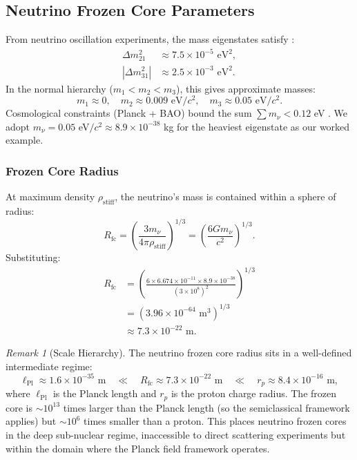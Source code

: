 \documentclass[11pt,a4paper]{article}
\newcommand{\lPl}{\ensuremath{\ell_{\mathrm{Pl}}}}
\newcommand{\rhostiff}{\ensuremath{\rho_{\mathrm{stiff}}}}
\newcommand{\Rfc}{\ensuremath{R_{\mathrm{fc}}}}
\theoremstyle{definition}
\theoremstyle{remark}
\newtheorem{remark}[theorem]{Remark}
\begin{document}
\subsection{Neutrino Frozen Core Parameters}
\label{sec:neutrino_parameters}

From neutrino oscillation experiments, the mass eigenstates satisfy \cite{PDG2024}:
\begin{align}
\Delta m_{21}^2 &\approx 7.5 \times 10^{-5} \text{ eV}^2, \\
|\Delta m_{31}^2| &\approx 2.5 \times 10^{-3} \text{ eV}^2.
\end{align}
In the normal hierarchy ($m_1 < m_2 < m_3$), this gives approximate masses:
\begin{equation}
m_1 \approx 0, \quad m_2 \approx 0.009 \text{ eV}/c^2, \quad m_3 \approx 0.05 \text{ eV}/c^2.
\end{equation}
Cosmological constraints (Planck + BAO) bound the sum $\sum m_\nu < 0.12$ eV \cite{Planck2018cosmo}. We adopt $m_\nu = 0.05$ eV$/c^2 \approx 8.9 \times 10^{-38}$ kg for the heaviest eigenstate as our worked example.

\subsubsection{Frozen Core Radius}

At maximum density $\rhostiff$, the neutrino's mass is contained within a sphere of radius:
\begin{equation}
\Rfc = \left( \frac{3 m_\nu}{4\pi \rhostiff} \right)^{1/3} = \left( \frac{6 G m_\nu}{c^2} \right)^{1/3}.
\end{equation}
Substituting:
\begin{align}
\Rfc &= \left( \frac{6 \times 6.674 \times 10^{-11} \times 8.9 \times 10^{-38}}{(3 \times 10^8)^2} \right)^{1/3} \nonumber \\
     &= \left( 3.96 \times 10^{-64} \text{ m}^3 \right)^{1/3} \nonumber \\
     &\approx 7.3 \times 10^{-22} \text{ m}.
\end{align}

\begin{remark}[Scale Hierarchy]
The neutrino frozen core radius sits in a well-defined intermediate regime:
\begin{equation}
\lPl \approx 1.6 \times 10^{-35} \text{ m} \quad \ll \quad \Rfc \approx 7.3 \times 10^{-22} \text{ m} \quad \ll \quad r_p \approx 8.4 \times 10^{-16} \text{ m},
\end{equation}
where $\lPl$ is the Planck length and $r_p$ is the proton charge radius. The frozen core is $\sim 10^{13}$ times larger than the Planck length (so the semiclassical framework applies) but $\sim 10^{6}$ times smaller than a proton. This places neutrino frozen cores in the deep sub-nuclear regime, inaccessible to direct scattering experiments but within the domain where the Planck field framework operates.
\end{remark}
\end{document}
